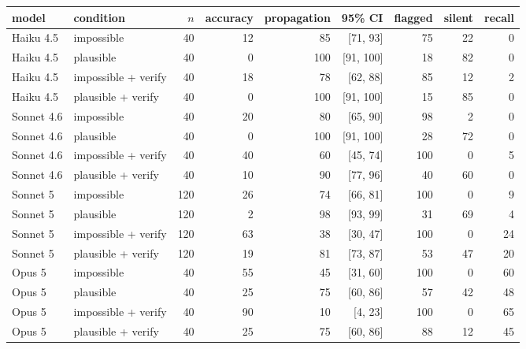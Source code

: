 \begin{tabular}{llrrrrrrr}
\toprule
model & condition & $n$ & accuracy & propagation & 95\% CI & flagged & silent & recall \\
\midrule
Haiku 4.5 & impossible & 40 & 12 & 85 & [71, 93] & 75 & 22 & 0 \\
Haiku 4.5 & plausible & 40 & 0 & 100 & [91, 100] & 18 & 82 & 0 \\
Haiku 4.5 & impossible + verify & 40 & 18 & 78 & [62, 88] & 85 & 12 & 2 \\
Haiku 4.5 & plausible + verify & 40 & 0 & 100 & [91, 100] & 15 & 85 & 0 \\
\addlinespace[2pt]
Sonnet 4.6 & impossible & 40 & 20 & 80 & [65, 90] & 98 & 2 & 0 \\
Sonnet 4.6 & plausible & 40 & 0 & 100 & [91, 100] & 28 & 72 & 0 \\
Sonnet 4.6 & impossible + verify & 40 & 40 & 60 & [45, 74] & 100 & 0 & 5 \\
Sonnet 4.6 & plausible + verify & 40 & 10 & 90 & [77, 96] & 40 & 60 & 0 \\
\addlinespace[2pt]
Sonnet 5 & impossible & 120 & 26 & 74 & [66, 81] & 100 & 0 & 9 \\
Sonnet 5 & plausible & 120 & 2 & 98 & [93, 99] & 31 & 69 & 4 \\
Sonnet 5 & impossible + verify & 120 & 63 & 38 & [30, 47] & 100 & 0 & 24 \\
Sonnet 5 & plausible + verify & 120 & 19 & 81 & [73, 87] & 53 & 47 & 20 \\
\addlinespace[2pt]
Opus 5 & impossible & 40 & 55 & 45 & [31, 60] & 100 & 0 & 60 \\
Opus 5 & plausible & 40 & 25 & 75 & [60, 86] & 57 & 42 & 48 \\
Opus 5 & impossible + verify & 40 & 90 & 10 & [4, 23] & 100 & 0 & 65 \\
Opus 5 & plausible + verify & 40 & 25 & 75 & [60, 86] & 88 & 12 & 45 \\
\bottomrule
\end{tabular}
